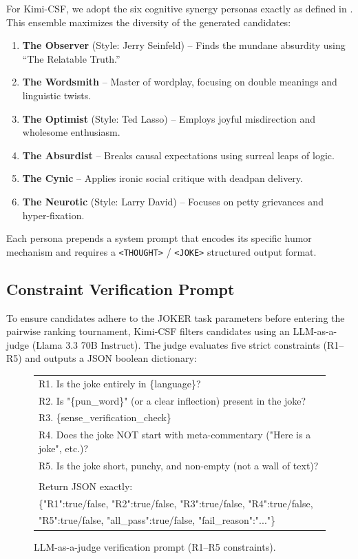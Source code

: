 \documentclass[]{ceurart}
\begin{document}
For Kimi-CSF, we adopt the six cognitive synergy personas exactly as defined in \cite{ajayi2025humorgen}. This ensemble maximizes the diversity of the generated candidates:
\begin{enumerate}
    \item \textbf{The Observer} (Style: Jerry Seinfeld) -- Finds the mundane absurdity using ``The Relatable Truth.''
    \item \textbf{The Wordsmith} -- Master of wordplay, focusing on double meanings and linguistic twists.
    \item \textbf{The Optimist} (Style: Ted Lasso) -- Employs joyful misdirection and wholesome enthusiasm.
    \item \textbf{The Absurdist} -- Breaks causal expectations using surreal leaps of logic.
    \item \textbf{The Cynic} -- Applies ironic social critique with deadpan delivery.
    \item \textbf{The Neurotic} (Style: Larry David) -- Focuses on petty grievances and hyper-fixation.
\end{enumerate}

Each persona prepends a system prompt that encodes its specific humor mechanism and requires a \texttt{<THOUGHT>} / \texttt{<JOKE>} structured output format.

\subsection{Constraint Verification Prompt}
\label{sec:app-verifier}

To ensure candidates adhere to the JOKER task parameters before entering the pairwise ranking tournament, Kimi-CSF filters candidates using an LLM-as-a-judge (Llama 3.3 70B Instruct). The judge evaluates five strict constraints (R1--R5) and outputs a JSON boolean dictionary:

\begin{figure}[h]
  \centering
  \ttfamily
  \begin{tabular}{l}
    R1. Is the joke entirely in \{language\}? \\
    R2. Is "\{pun\_word\}" (or a clear inflection) present in the joke? \\
    R3. \{sense\_verification\_check\} \\
    R4. Does the joke NOT start with meta-commentary ("Here is a joke", etc.)? \\
    R5. Is the joke short, punchy, and non-empty (not a wall of text)? \\
    \\
    Return JSON exactly: \\
    \{"R1":true/false, "R2":true/false, "R3":true/false, "R4":true/false, \\
      "R5":true/false, "all\_pass":true/false, "fail\_reason":"..."\}
  \end{tabular}
  \caption{\normalfont LLM-as-a-judge verification prompt (R1--R5 constraints).}
  \label{fig:prompt-verifier}
\end{figure}
\end{document}
